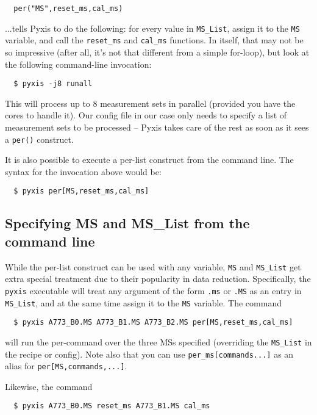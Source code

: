 \documentclass[a4paper,10pt]{article}
\begin{document}
\begin{verbatim}
  per("MS",reset_ms,cal_ms)
\end{verbatim}

...tells Pyxis to do the following: for every value in {\tt MS\_List}, assign it to the {\tt MS} variable, and call
the {\tt reset\_ms} and {\tt cal\_ms} functions. In itself, that may not be so impressive (after all, it's not that different 
from a simple for-loop), but look at the following command-line invocation:

\begin{verbatim}
  $ pyxis -j8 runall
\end{verbatim}

This will process up to 8 measurement sets in parallel (provided you have the cores to handle it). Our 
config file in our case only needs to specify a list of measurement sets to be processed -- Pyxis takes care 
of the rest as soon as it sees a {\tt per()} construct.

It is also possible to execute a per-list construct from the command line. The syntax for the invocation above would be:

\begin{verbatim}
  $ pyxis per[MS,reset_ms,cal_ms]
\end{verbatim}

\subsection{Specifying MS and MS\_List from the command line}

While the per-list construct can be used with any variable, {\tt MS} and {\tt MS\_List} get extra
special treatment due to their popularity in data reduction. Specifically, the {\tt pyxis} executable will treat any 
argument of the form {\tt *.ms} or {\tt *.MS} as an entry in {\tt MS\_List}, and at the same time assign it to the {\tt MS} 
variable. The command

\begin{verbatim}
  $ pyxis A773_B0.MS A773_B1.MS A773_B2.MS per[MS,reset_ms,cal_ms]
\end{verbatim}

will run the per-command over the three MSs specified (overriding the {\tt MS\_List} in the recipe or config). Note also that you can use {\tt per\_ms[commands...]} as an alias for {\tt per[MS,commands,...]}.

Likewise, the command

\begin{verbatim}
  $ pyxis A773_B0.MS reset_ms A773_B1.MS cal_ms
\end{verbatim}
\end{document}
